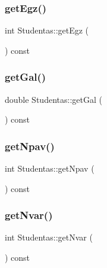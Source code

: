 \subsubsection{\texorpdfstring{getEgz()}{getEgz()}}
{\footnotesize\ttfamily int Studentas\+::get\+Egz (\begin{DoxyParamCaption}{ }\end{DoxyParamCaption}) const\hspace{0.3cm}{\ttfamily [inline]}}

\mbox{\label{class_studentas_adb71a1b0d9e2e5a79f4fb1238d56f3ce}} 
\subsubsection{\texorpdfstring{getGal()}{getGal()}}
{\footnotesize\ttfamily double Studentas\+::get\+Gal (\begin{DoxyParamCaption}{ }\end{DoxyParamCaption}) const\hspace{0.3cm}{\ttfamily [inline]}}

\mbox{\label{class_studentas_a4d98916d86a6a4669463d7436ba6a01a}} 
\subsubsection{\texorpdfstring{getNpav()}{getNpav()}}
{\footnotesize\ttfamily int Studentas\+::get\+Npav (\begin{DoxyParamCaption}{ }\end{DoxyParamCaption}) const\hspace{0.3cm}{\ttfamily [inline]}}

\mbox{\label{class_studentas_a504840a8d0aac4dd9d34c4e52c392254}} 
\subsubsection{\texorpdfstring{getNvar()}{getNvar()}}
{\footnotesize\ttfamily int Studentas\+::get\+Nvar (\begin{DoxyParamCaption}{ }\end{DoxyParamCaption}) const\hspace{0.3cm}{\ttfamily [inline]}}

